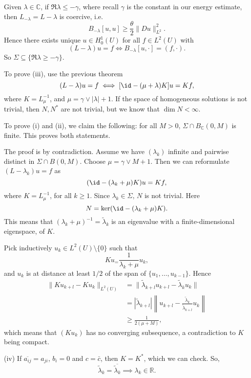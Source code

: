 \documentclass[12pt]{article}
\begin{document}
\begin{proofbox}
	Given $\lambda \in \mathbb{C}$, if $\Re \lambda \leq - \gamma$, where recall $\gamma$ is the constant in our energy estimate, then $L_{-\lambda} = L - \lambda$ is coercive, i.e.
	\[
		B_{-\lambda}[u, u] \geq \frac{\theta}{2} \|Du\|_{L^2}^2.
	\]
	Hence there exists unique $u \in H^1_0(U)$ for all $f \in L^2(U)$ with
	\[
		(L - \lambda) u = f \iff B_{-\lambda}[u, \cdot] = (f, \cdot).
	\]
	So $\Sigma \subseteq \{\Re \lambda \geq -\gamma\}$.

	To prove (iii), use the previous theorem
	\[
		(L - \lambda) u = f \iff [\id - (\mu + \lambda)K]u = K f,
	\]
	where $K = L_{\mu}^{-1}$, and $\mu = \gamma \vee |\lambda| + 1$. If the space of homogeneous solutions is not trivial, then $N, N^{\ast}$ are not trivial, but we know that $\dim N < \infty$.

	To prove (i) and (ii), we claim the following: for all $M >0$, $\Sigma \cap B_{\mathbb{C}}(0, M)$ is finite. This proves both statements.

	The proof is by contradiction. Assume we have $(\lambda_k)$ infinite and pairwise distinct in $\Sigma \cap B(0, M)$. Choose $\mu = \gamma \vee M + 1$. Then we can reformulate $(L - \lambda_k)  u = f$ as
	\[
		(\id - (\lambda_k + \mu)K)u = Kf,
	\]
	where $K = L_\mu^{-1}$, for all $k \geq 1$. Since $\lambda_k \in \Sigma$, $N$ is not trivial. Here
	\[
	N = \ker (\id - (\lambda_k + \mu)K).
	\]
	This means that $(\lambda_k + \mu)^{-1} = \tilde \lambda_{k}$ is an eigenvalue with a finite-dimensional eigenspace, of $K$.

	Pick inductively $u_k \in L^2(U) \setminus \{0\}$ such that
	\[
	K u_ = \frac{1}{\lambda_k + \mu} u_k,
	\]
	and $u_k$ is at distance at least $1/2$ of the span of $\{u_1, \ldots, u_{k-1}\}$. Hence
	\begin{align*}
		\|K u_{k+l} - K u_k\|_{L^2(U)} &= \|\tilde \lambda_{k + l} u_{k+l} - \tilde \lambda_{k} u_k\| \\
					       &= |\tilde \lambda_{k+l}| \left\|u_{k+l} - \frac{\tilde \lambda_k}{\tilde \lambda_{k+l}} u_k\right\| \\
					       &\geq \frac{1}{2(\mu + M)},
	\end{align*}
	which means that $(Ku_k)$ has no converging subsequence, a contradiction to $K$ being compact.

	(iv) If $\overline{a_{ij}} = a_{ji}$, $b_i = 0$ and $c = \bar c$, then $K = K^{\ast}$, which we can check. So,
	\[
	\tilde \lambda_k = \overline{\tilde \lambda_k} \implies \lambda_k \in \mathbb{R}.
	\]
\end{proofbox}
\end{document}
